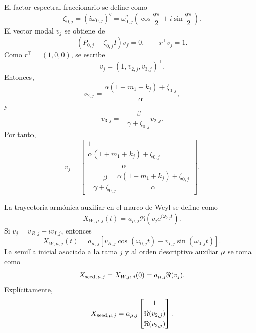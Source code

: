 \documentclass[journal]{IEEEtran}
\begin{document}
El factor espectral fraccionario se define como
\begin{equation}
\label{eq:zeta_mu_machado}
\zeta_{0,j}
=
(i\omega_{0,j})^q
=
\omega_{0,j}^q
\left(
\cos\frac{q\pi}{2}
+
i\sin\frac{q\pi}{2}
\right).
\end{equation}
El vector modal \(v_j\) se obtiene de
\begin{equation}
\label{eq:modal_problem_mu_machado}
(P_{0,j}-\zeta_{0,j}I)v_j=0,
\qquad
r^\top v_j=1.
\end{equation}
Como \(r^\top=(1,0,0)\), se escribe
\[
v_j=(1,v_{2,j},v_{3,j})^\top.
\]
Entonces,
\begin{equation}
\label{eq:v2_machado}
v_{2,j}
=
\frac{\alpha(1+m_1+k_j)+\zeta_{0,j}}{\alpha},
\end{equation}
y
\begin{equation}
\label{eq:v3_machado}
v_{3,j}
=
-\frac{\beta}{\gamma+\zeta_{0,j}}v_{2,j}.
\end{equation}
Por tanto,
\begin{equation}
\label{eq:v_machado}
v_j
=
\begin{bmatrix}
1\\[1mm]
\dfrac{\alpha(1+m_1+k_j)+\zeta_{0,j}}{\alpha}\\[3mm]
-\dfrac{\beta}{\gamma+\zeta_{0,j}}
\dfrac{\alpha(1+m_1+k_j)+\zeta_{0,j}}{\alpha}
\end{bmatrix}.
\end{equation}

La trayectoria armónica auxiliar en el marco de Weyl se define como
\begin{equation}
\label{eq:XW_mu_machado}
X_{W,\mu,j}(t)
=
a_{\mu,j}\Re\left(v_je^{i\omega_{0,j}t}\right).
\end{equation}
Si \(v_j=v_{R,j}+iv_{I,j}\), entonces
\begin{equation}
\label{eq:XW_mu_real_machado}
X_{W,\mu,j}(t)
=
a_{\mu,j}
\left[
v_{R,j}\cos(\omega_{0,j}t)
-
v_{I,j}\sin(\omega_{0,j}t)
\right].
\end{equation}
La semilla inicial asociada a la rama \(j\) y al orden descriptivo auxiliar
\(\mu\) se toma como
\begin{equation}
\label{eq:Xseed_mu_machado}
X_{{\rm seed},\mu,j}
=
X_{W,\mu,j}(0)
=
a_{\mu,j}\Re(v_j).
\end{equation}
Explícitamente,
\begin{equation}
\label{eq:Xseed_mu_explicit_machado}
X_{{\rm seed},\mu,j}
=
a_{\mu,j}
\begin{bmatrix}
1\\[1mm]
\Re(v_{2,j})\\[1mm]
\Re(v_{3,j})
\end{bmatrix}.
\end{equation}
\end{document}
